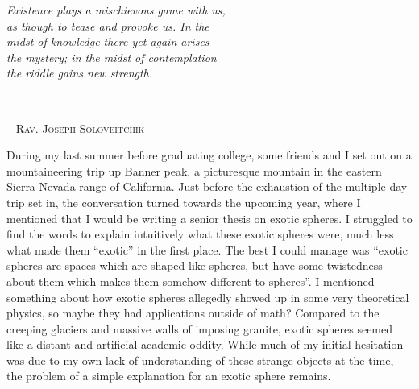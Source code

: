 \begin{flushleft}
	\textsl{Existence plays a mischievous game with us,}\\
	\textsl{as though to tease and provoke us. In the }\\
	\textsl{midst of knowledge there yet again arises }\\
	\textsl{the mystery; in the midst of contemplation}\\
	\textsl{the riddle gains new strength.}\\
	\rule[0pt]{19.5em}{0.5pt}\\
	-- \textsc{Rav. Joseph Soloveitchik}\\
	\vspace{2em}
\end{flushleft}


During my last summer before graduating college, some friends and I set out on a mountaineering trip up Banner peak, a picturesque mountain in the eastern Sierra Nevada range of California. Just before the exhaustion of the multiple day trip set in, the conversation turned towards the upcoming year, where I mentioned that I would be writing a senior thesis on exotic spheres.
I struggled to find the words to explain intuitively what these exotic spheres were, much less what made them ``exotic'' in the first place. 
The best I could manage was ``exotic spheres are spaces which are shaped like spheres, but have some twistedness about them which makes them somehow different to spheres''. I mentioned something about how exotic spheres allegedly showed up in some very theoretical physics, so maybe they had applications outside of math?
Compared to the creeping glaciers and massive walls of imposing granite, exotic spheres seemed like a distant and artificial academic oddity. 
While much of my initial hesitation was due to my own lack of understanding of these strange objects at the time, the problem of a simple explanation for an exotic sphere remains. 


